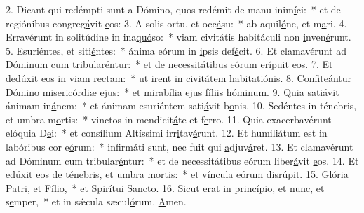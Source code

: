 2. Dicant qui redémpti sunt a Dómino, quos redémit de manu inim\uline{í}ci:~* et de regiónibus congreg\uline{á}vit \uline{e}os:
3. A solis ortu, et occ\uline{á}su:~* ab aquil\uline{ó}ne, et m\uline{a}ri.
4. Erravérunt in solitúdine in ina\uline{quó}so:~* viam civitátis habitáculi non \uline{i}nven\uline{é}runt.
5. Esuriéntes, et siti\uline{é}ntes:~* ánima eórum in \uline{i}psis def\uline{é}cit.
6. Et clamavérunt ad Dóminum cum tribular\uline{é}ntur:~* et de necessitátibus eórum er\uline{í}puit \uline{e}os.
7. Et dedúxit eos in viam r\uline{e}ctam:~* ut irent in civitátem habit\uline{a}ti\uline{ó}nis.
8. Confiteántur Dómino misericórdiæ \uline{e}jus:~* et mirabília ejus f\uline{í}liis h\uline{ó}minum.
9. Quia satiávit ánimam in\uline{á}nem:~* et ánimam esuriéntem sati\uline{á}vit b\uline{o}nis.
10. Sedéntes in ténebris, et umbra m\uline{o}rtis:~* vinctos in mendicit\uline{á}te et f\uline{e}rro.
11. Quia exacerbavérunt elóquia D\uline{e}i:~* et consílium Altíssimi irr\uline{i}tav\uline{é}runt.
12. Et humiliátum est in labóribus cor e\uline{ó}rum:~* infirmáti sunt, nec fuit qui \uline{a}djuv\uline{á}ret.
13. Et clamavérunt ad Dóminum cum tribular\uline{é}ntur:~* et de necessitátibus eórum liber\uline{á}vit \uline{e}os.
14. Et edúxit eos de ténebris, et umbra m\uline{o}rtis:~* et víncula e\uline{ó}rum disr\uline{ú}pit.
15. Glória Patri, et F\uline{í}lio,~* et Spir\uline{í}tui S\uline{a}ncto.
16. Sicut erat in princípio, et nunc, et s\uline{e}mper,~* et in sǽcula sæcul\uline{ó}rum. \uline{A}men.
